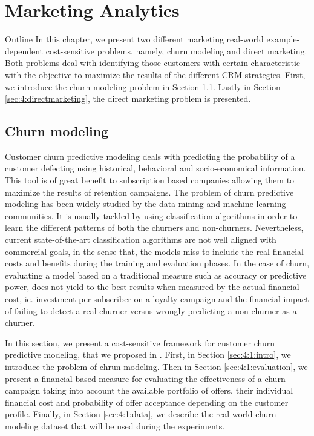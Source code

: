\chapter{Marketing Analytics}\label{ch:4}

\begin{remark}{Outline}
In this chapter, we present two different marketing real-world example-dependent 
cost-sensitive problems, namely, churn modeling and direct marketing. Both problems deal 
with identifying those customers with certain characteristic with the objective to maximize the 
results of the different CRM strategies.
First, we introduce the churn modeling problem in Section \ref{sec:4:churn}. Lastly in Section 
\ref{sec:4:directmarketing}, the direct marketing problem is presented.
\end{remark}


\section{Churn modeling}
\label{sec:4:churn}

Customer churn predictive modeling deals with predicting the probability of a customer defecting 
using historical, behavioral and socio-economical information. This tool is of great benefit to 
subscription based companies allowing them to maximize the results of retention campaigns. The 
problem of churn predictive modeling has been widely studied by the data mining and machine learning
communities. It is usually tackled by using classification algorithms in order to learn the 
different patterns of both the churners and non-churners. Nevertheless, current state-of-the-art 
classification algorithms are not well aligned with commercial goals, in the sense that, the models 
miss to include the real financial costs and benefits during the training and evaluation phases. In 
the case of churn, evaluating a model based on a traditional measure such as accuracy or predictive 
power, does not yield to the best results when measured by the actual financial cost, ie. 
investment per subscriber on a loyalty campaign and the financial impact of failing to detect a 
real churner versus wrongly predicting a non-churner as a churner.

In this section, we present a cost-sensitive framework for customer churn predictive modeling, 
that we proposed in \citep{CorreaBahnsen2015a}. First, in Section \ref{sec:4:1:intro}, we introduce 
the problem of chrun modeling. Then in Section \ref{sec:4:1:evaluation}, we present a financial 
based measure for evaluating the effectiveness of a churn campaign taking into account the available 
portfolio of offers, their individual financial cost and probability of offer acceptance depending 
on the customer profile. Finally, in Section \ref{sec:4:1:data}, we describe the real-world churn 
modeling dataset that will be used during the experiments.


